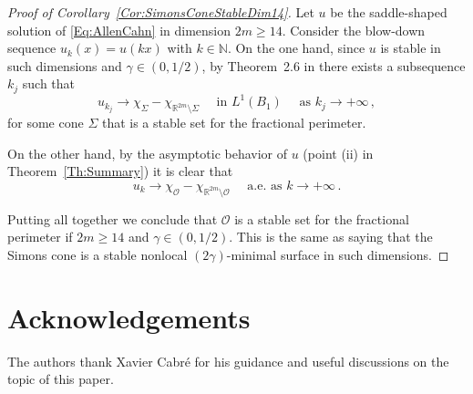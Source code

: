\documentclass[twoside,leqno,symbols-for-thanks, draft]{rmi}
\numberwithin{equation}{section}
\theoremstyle{definition}
\newcommand{\con}[1]{\mathbb{#1}}
\newcommand{\R}{\con{R}} %
\newcommand{\N}{\con{N}} %
\newcommand{\ocal}{\mathcal{O}}
\newcommand{\s}{\gamma}
\begin{document}
\begin{proof}[Proof of Corollary~\ref{Cor:SimonsConeStableDim14}]
	Let $u$ be the saddle-shaped solution of \eqref{Eq:AllenCahn} in dimension $2m\geq 14$. Consider the blow-down sequence $u_k(x) = u(kx)$ with $k\in \N$. On the one hand, since $u$ is stable in such dimensions and $\s\in(0,1/2)$, by Theorem~2.6 in \cite{CabreCintiSerra-Stable} there exists a subsequence $k_j$ such that
	$$ u_{k_j} \to \chi_{\Sigma}-\chi_{\R^{2m}\setminus\Sigma} \quad \textrm{ in } L^1(B_1) \quad \textrm{ as } k_j\to+\infty\,, $$
	for some cone $\Sigma$ that is a stable set for the fractional perimeter.
	
	On the other hand, by the asymptotic behavior of $u$ (point (ii) in Theorem~\ref{Th:Summary}) it is clear that
	$$ u_{k} \to \chi_{\ocal}-\chi_{\R^{2m}\setminus\ocal} \quad \textrm{ a.e. as } k\to+\infty\,.$$
	
	Putting all together we conclude that $\ocal$ is a stable set for the fractional perimeter if $2m\geq 14$ and $\s\in(0,1/2)$. This is the same as saying that the Simons cone is a stable nonlocal $(2\s)$-minimal surface in such dimensions.
\end{proof}



\section*{Acknowledgements}

The authors thank Xavier Cabr\'e for his guidance and useful discussions on the topic of this paper.




\end{document}
